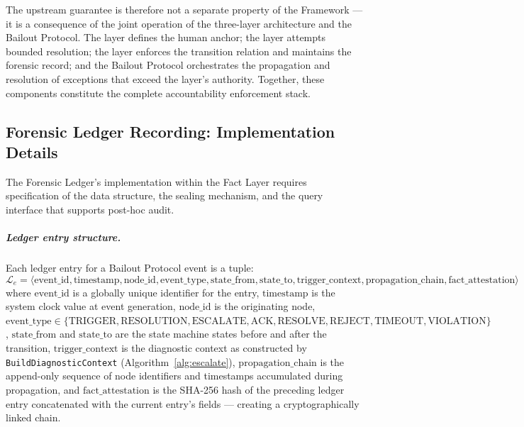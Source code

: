 The upstream guarantee is therefore not a separate property of the \bxthree{} Framework — it is a consequence of the joint operation of the three-layer architecture and the Bailout Protocol. The \purpose{} layer defines the human anchor; the \bounds{} layer attempts bounded resolution; the \fact{} layer enforces the transition relation and maintains the forensic record; and the Bailout Protocol orchestrates the propagation and resolution of exceptions that exceed the \bounds{} layer's authority. Together, these components constitute the complete accountability enforcement stack.

\subsection{Forensic Ledger Recording: Implementation Details}

The Forensic Ledger's implementation within the \bxthree{} Fact Layer requires specification of the data structure, the sealing mechanism, and the query interface that supports post-hoc audit.

\subparagraph{Ledger entry structure.} Each ledger entry for a Bailout Protocol event is a tuple:
\begin{equation}
\mathcal{L}_e = \langle \text{event\_id}, \text{timestamp}, \text{node\_id}, \text{event\_type}, \text{state\_from}, \text{state\_to}, \text{trigger\_context}, \text{propagation\_chain}, \text{fact\_attestation} \rangle \tag{LE}
\end{equation}
where $\text{event\_id}$ is a globally unique identifier for the entry, $\text{timestamp}$ is the system clock value at event generation, $\text{node\_id}$ is the originating node, $\text{event\_type} \in \{\text{TRIGGER}, \text{RESOLUTION}, \text{ESCALATE}, \text{ACK}, \text{RESOLVE}, \text{REJECT}, \text{TIMEOUT}, \text{VIOLATION}\}$, $\text{state\_from}$ and $\text{state\_to}$ are the state machine states before and after the transition, $\text{trigger\_context}$ is the diagnostic context as constructed by \texttt{BuildDiagnosticContext} (Algorithm~\ref{alg:escalate}), $\text{propagation\_chain}$ is the append-only sequence of node identifiers and timestamps accumulated during propagation, and $\text{fact\_attestation}$ is the SHA-256 hash of the preceding ledger entry concatenated with the current entry's fields — creating a cryptographically linked chain.

